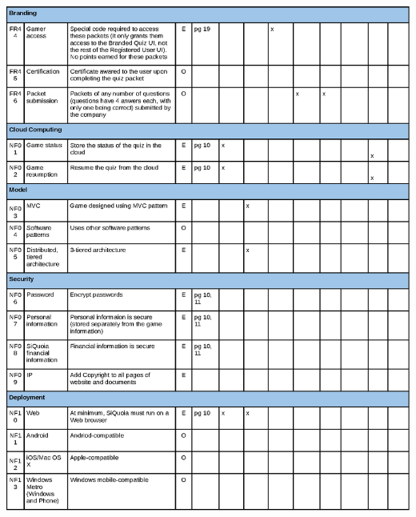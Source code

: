 \documentclass[12pt]{article}
\begin{document}
\begin{center}
\newpage
\includegraphics[width=\textwidth]{trace4}
\end{center}




\end{document}
